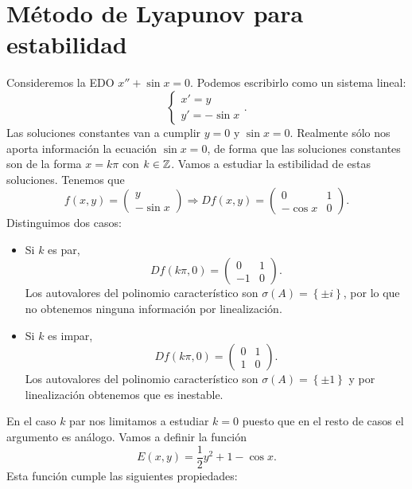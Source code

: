 \chapter{Método de Lyapunov para estabilidad}
\begin{eg}
Consideremos la EDO $\displaystyle x '' + \sin x = 0 $. Podemos escribirlo como un sistema lineal:
\[
\begin{cases}
x' = y \\
y' = - \sin x
\end{cases}
.\]
Las soluciones constantes van a cumplir $\displaystyle y = 0 $ y $\displaystyle \sin x = 0 $. Realmente sólo nos aporta información la ecuación $\displaystyle \sin x = 0 $, de forma que las soluciones constantes son de la forma $\displaystyle x = k \pi  $ con $\displaystyle k \in \mathbb{Z} $. Vamos a estudiar la estibilidad de estas soluciones. Tenemos que 
\[f\left(x,y\right) = \begin{pmatrix} y \\ - \sin x \end{pmatrix} \Rightarrow Df\left(x,y\right)=\begin{pmatrix} 0 & 1 \\ - \cos x & 0 \end{pmatrix} .\]
Distinguimos dos casos:
\begin{itemize}
\item Si $\displaystyle k  $ es par, 
	\[Df\left(k \pi , 0\right)=\begin{pmatrix}  0 & 1 \\-1 & 0 \end{pmatrix} .\]
	Los autovalores del polinomio característico son $\displaystyle \sigma\left(A\right)= \left\{ \pm i\right\}  $, por lo que no obtenemos ninguna información por linealización. 	
\item Si $\displaystyle k $ es impar, 
	\[Df\left(k\pi, 0\right)=\begin{pmatrix} 0 & 1 \\ 1 & 0 \end{pmatrix} .\]
	Los autovalores del polinomio característico son $\displaystyle \sigma \left(A\right)= \left\{ \pm1\right\}  $ y por linealización obtenemos que es inestable. 
\end{itemize}
En el caso $\displaystyle k  $ par nos limitamos a estudiar $\displaystyle k = 0 $ puesto que en el resto de casos el argumento es análogo. Vamos a definir la función
\[E\left(x,y\right)=\frac{1}{2}y^{2} + 1 - \cos x .\]
Esta función cumple las siguientes propiedades:
\begin{itemize}

\end{itemize}
\end{eg}

